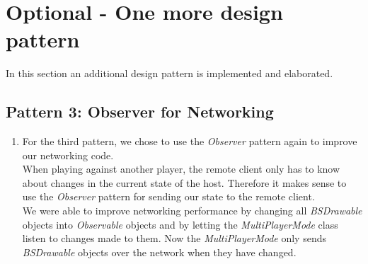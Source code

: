 \documentclass[a4paper,11pt]{article}
\begin{document}
\newpage
\section{Optional - One more design pattern \\}
In this section an additional design pattern is implemented and elaborated.
\subsection{Pattern 3:  Observer for Networking}
\begin{enumerate}
\item For the third pattern, we chose to use the \textit{Observer} pattern again to improve our networking code. \\
When playing against another player, the remote client only has to know about changes in the current state of the host.
Therefore it makes sense to use the \textit{Observer} pattern for sending our state to the remote client. \\
We were able to improve networking performance by changing all \textit{BSDrawable} objects into \textit{Observable} objects and by letting the \textit{MultiPlayerMode} class listen to changes made to them.
Now the \textit{MultiPlayerMode} only sends \textit{BSDrawable} objects over the network when they have changed.


\end{enumerate}
\end{document}
